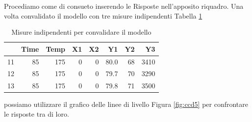 \documentclass[
  11pt,
]{book}
\begin{document}
Procediamo come di consueto inserendo le Risposte nell'apposito riquadro. Una volta convalidato il modello con tre misure indipendenti Tabella \ref{tab:matrconv}
\newpage

\begin{table}

\caption{\label{tab:matrconv}Misure indipendenti per convalidare il modello}
\centering
\begin{tabular}[t]{lrrrrrrr}
\toprule
  & Time & Temp & X1 & X2 & Y1 & Y2 & Y3\\
\midrule
11 & 85 & 175 & 0 & 0 & 80.0 & 68 & 3410\\
12 & 85 & 175 & 0 & 0 & 79.7 & 70 & 3290\\
13 & 85 & 175 & 0 & 0 & 79.8 & 71 & 3500\\
\bottomrule
\end{tabular}
\end{table}

possiamo utilizzare il grafico delle linee di livello Figura \ref{fig:ccd5} per confrontare le risposte tra di loro.
\end{document}
